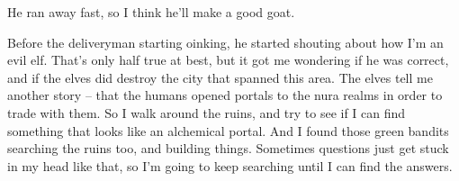 \begin{multicols}{2}
\begin{exampletext}
  He ran away fast, so I think he'll make a good goat.

  Before the deliveryman starting oinking, he started shouting about how I'm an evil elf.
  That's only half true at best, but it got me wondering if he was correct, and if the elves did destroy the city that spanned this area.
  The elves tell me another story -- that the humans opened portals to the nura realms in order to trade with them.
  So I walk around the ruins, and try to see if I can find something that looks like an alchemical portal.
  And I found those green bandits searching the ruins too, and building things.
  Sometimes questions just get stuck in my head like that, so I'm going to keep searching until I can find the answers.

\end{exampletext}

\end{multicols}
